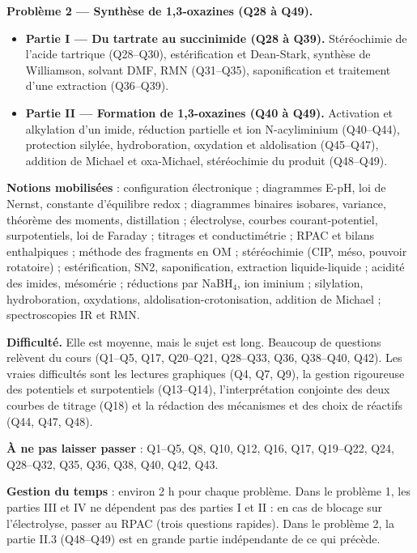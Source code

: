\documentclass[11pt,a4paper]{article}
\providecommand{\tightlist}{\setlength{\itemsep}{0pt}\setlength{\parskip}{0pt}}
\begin{document}
\textbf{Problème 2 --- Synthèse de 1,3-oxazines (Q28 à Q49).}

\begin{itemize}
\tightlist
\item
  \textbf{Partie I --- Du tartrate au succinimide (Q28 à Q39).} Stéréochimie de l'acide tartrique (Q28--Q30), estérification et Dean-Stark, synthèse de Williamson, solvant DMF, RMN (Q31--Q35), saponification et traitement d'une extraction (Q36--Q39).
\item
  \textbf{Partie II --- Formation de 1,3-oxazines (Q40 à Q49).} Activation et alkylation d'un imide, réduction partielle et ion N-acyliminium (Q40--Q44), protection silylée, hydroboration, oxydation et aldolisation (Q45--Q47), addition de Michael et oxa-Michael, stéréochimie du produit (Q48--Q49).
\end{itemize}

\textbf{Notions mobilisées} : configuration électronique ; diagrammes E-pH, loi de Nernst, constante d'équilibre redox ; diagrammes binaires isobares, variance, théorème des moments, distillation ; électrolyse, courbes courant-potentiel, surpotentiels, loi de Faraday ; titrages et conductimétrie ; RPAC et bilans enthalpiques ; méthode des fragments en OM ; stéréochimie (CIP, méso, pouvoir rotatoire) ; estérification, SN2, saponification, extraction liquide-liquide ; acidité des imides, mésomérie ; réductions par NaBH\(_4\), ion iminium ; silylation, hydroboration, oxydations, aldolisation-\allowbreak{}crotonisation, addition de Michael ; spectroscopies IR et RMN.

\textbf{Difficulté.} Elle est moyenne, mais le sujet est long. Beaucoup de questions relèvent du cours (Q1--Q5, Q17, Q20--Q21, Q28--Q33, Q36, Q38--Q40, Q42). Les vraies difficultés sont les lectures graphiques (Q4, Q7, Q9), la gestion rigoureuse des potentiels et surpotentiels (Q13--Q14), l'interprétation conjointe des deux courbes de titrage (Q18) et la rédaction des mécanismes et des choix de réactifs (Q44, Q47, Q48).

\textbf{À ne pas laisser passer} : Q1--Q5, Q8, Q10, Q12, Q16, Q17, Q19--Q22, Q24, Q28--Q32, Q35, Q36, Q38, Q40, Q42, Q43.

\textbf{Gestion du temps} : environ 2 h pour chaque problème. Dans le problème 1, les parties III et IV ne dépendent pas des parties I et II : en cas de blocage sur l'électrolyse, passer au RPAC (trois questions rapides). Dans le problème 2, la partie II.3 (Q48--Q49) est en grande partie indépendante de ce qui précède.
\end{document}
